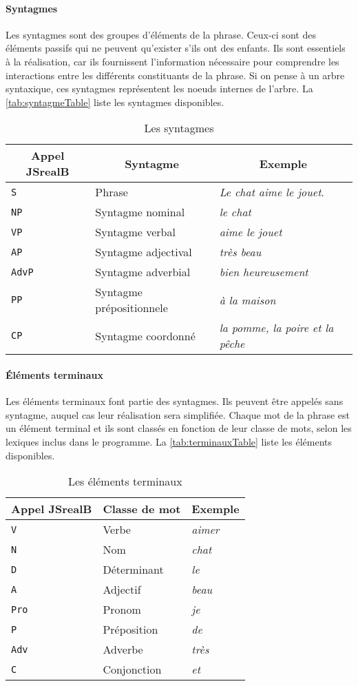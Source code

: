 \documentclass[11pt]{article} %
\newcommand{\system}[1]{\textsf{#1}}
\newcommand{\JSB}{\system{JSrealB}}
\newcommand{\real}[1]{\emph{#1}}
\begin{document}
\paragraph{Syntagmes}

Les syntagmes sont des groupes d'éléments de la phrase. Ceux-ci sont
des éléments passifs qui ne peuvent qu'exister s'ils ont des enfants.
Ils sont essentiels à la réalisation, car ils fournissent l'information
nécessaire pour comprendre les interactions entre les différents constituants
de la phrase. Si on pense à un arbre syntaxique, ces syntagmes représentent
les noeuds internes de l'arbre. La \autoref{tab:syntagmeTable} liste les syntagmes disponibles.
\begin{table}[h]
\centering
\caption{Les syntagmes}
\begin{tabular}{|l|l|l|}
\hline 
\multicolumn{1}{|c}{Appel \JSB{}}  & \multicolumn{1}{|c}{Syntagme} & \multicolumn{1}{|c|}{Exemple}\tabularnewline
\hline 
\hline 
\texttt{S} & Phrase & \real{Le chat aime le jouet}.\tabularnewline
\hline 
\texttt{NP} & Syntagme nominal & \real{le chat}\tabularnewline
\hline 
\texttt{VP} & Syntagme verbal & \real{aime le jouet}\tabularnewline
\hline 
\texttt{AP} & Syntagme adjectival & \real{très beau}\tabularnewline
\hline 
\texttt{AdvP} & Syntagme adverbial & \real{bien heureusement}\tabularnewline
\hline 
\texttt{PP} & Syntagme prépositionnele & \real{à la maison}\tabularnewline
\hline 
\texttt{CP} & Syntagme coordonné & \real{la pomme, la poire et la pêche}\tabularnewline
\hline 
\end{tabular}

\label{tab:syntagmeTable}
\end{table}


\paragraph{Éléments terminaux}

Les éléments terminaux font partie des syntagmes. Ils peuvent être
appelés sans syntagme, auquel cas leur réalisation sera simplifiée.
Chaque mot de la phrase est un élément terminal et ils sont classés
en fonction de leur classe de mots, selon les lexiques inclus dans le
programme. La \autoref{tab:terminauxTable} liste les éléments disponibles.

\begin{table}[h]
\centering
\caption{Les éléments terminaux}
\label{tab:terminauxTable}
\begin{tabular}{|l|l|l|}
\hline 
\multicolumn{1}{|c}{Appel \JSB{}}  & \multicolumn{1}{|c}{Classe de mot} & \multicolumn{1}{|c|}{Exemple}\tabularnewline
\hline 
\hline 
\texttt{V} & Verbe & \real{aimer}\tabularnewline
\hline 
\texttt{N} & Nom & \real{chat}\tabularnewline
\hline 
\texttt{D} & Déterminant & \real{le}\tabularnewline
\hline 
\texttt{A} & Adjectif & \real{beau}\tabularnewline
\hline 
\texttt{Pro} & Pronom & \real{je}\tabularnewline
\hline 
\texttt{P} & Préposition & \real{de}\tabularnewline
\hline 
\texttt{Adv} & Adverbe & \real{très}\tabularnewline
\hline 
\texttt{C} & Conjonction & \real{et}\tabularnewline
\hline 
\end{tabular}
\end{table}
\end{document}
